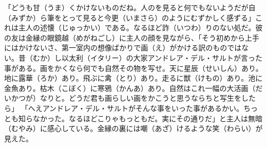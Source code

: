 \documentclass{book}
\begin{document}
「どうも甘（うま）くかけないものだね。人のを見ると何でもないようだが自（みずか）ら筆をとって見ると今更（いまさら）のようにむずかしく感ずる」これは主人の述懐（じゅっかい）である。なるほど詐（いつわ）りのない処だ。彼の友は金縁の眼鏡越（めがねごし）に主人の顔を見ながら、「そう初めから上手にはかけないさ、第一室内の想像ばかりで画（え）がかける訳のものではない。昔（むか）し以太利（イタリー）の大家アンドレア・デル・サルトが言った事がある。画をかくなら何でも自然その物を写せ。天に星辰（せいしん）あり。地に露華（ろか）あり。飛ぶに禽（とり）あり。走るに獣（けもの）あり。池に金魚あり。枯木（こぼく）に寒鴉（かんあ）あり。自然はこれ一幅の大活画（だいかつが）なりと。どうだ君も画らしい画をかこうと思うならちと写生をしたら」
「へえアンドレア・デル・サルトがそんな事をいった事があるかい。ちっとも知らなかった。なるほどこりゃもっともだ。実にその通りだ」と主人は無暗（むやみ）に感心している。金縁の裏には嘲（あざ）けるような笑（わらい）が見えた。
\end{document}
